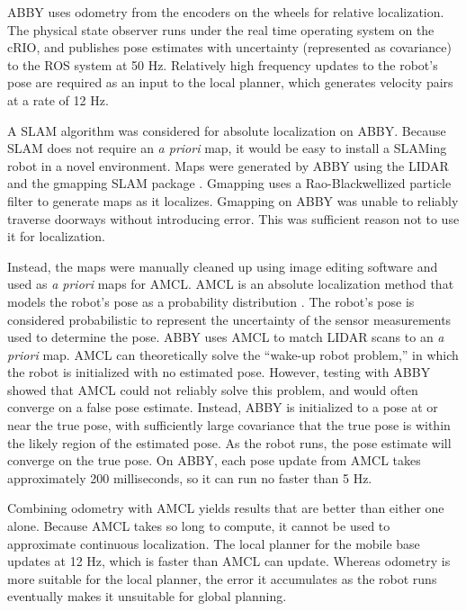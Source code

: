 \documentclass[]{cwru} %
\begin{document}
ABBY uses odometry from the encoders on the wheels for relative
localization. The physical state observer runs under the real time
operating system on the cRIO, and publishes pose estimates with
uncertainty (represented as covariance) to the ROS system at 50 Hz.
Relatively high frequency updates to the robot's pose are required as an
input to the local planner, which generates velocity pairs at a rate of
12 Hz.

A SLAM algorithm was considered for absolute localization on ABBY.
Because SLAM does not require an \emph{a priori} map, it would be easy
to install a SLAMing robot in a novel environment. Maps were generated
by ABBY using the LIDAR and the gmapping SLAM package \cite{grisetti}. Gmapping
uses a Rao-Blackwellized particle filter to generate maps as it
localizes. Gmapping on ABBY was unable to reliably traverse doorways
without introducing error. This was sufficient reason not to use it for
localization.

Instead, the maps were manually cleaned up using image editing software
and used as \emph{a priori} maps for AMCL. AMCL is an absolute
localization method that models the robot's pose as a probability
distribution \cite{thrun}. The robot's pose is considered probabilistic to
represent the uncertainty of the sensor measurements used to determine
the pose. ABBY uses AMCL to match LIDAR scans to an \emph{a priori} map.
AMCL can theoretically solve the ``wake-up robot problem,'' in which the
robot is initialized with no estimated pose. However, testing with ABBY
showed that AMCL could not reliably solve this problem, and would often
converge on a false pose estimate. Instead, ABBY is initialized to a
pose at or near the true pose, with sufficiently large covariance that
the true pose is within the likely region of the estimated pose. As the
robot runs, the pose estimate will converge on the true pose. On ABBY,
each pose update from AMCL takes approximately 200 milliseconds, so it
can run no faster than 5 Hz.

Combining odometry with AMCL yields results that are better than either
one alone. Because AMCL takes so long to compute, it cannot be used to
approximate continuous localization. The local planner for the mobile
base updates at 12 Hz, which is faster than AMCL can update. Whereas
odometry is more suitable for the local planner, the error it
accumulates as the robot runs eventually makes it unsuitable for global
planning.
\end{document}
